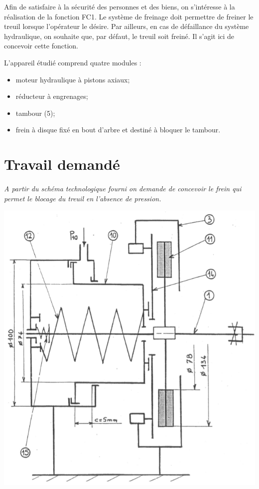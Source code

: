 \documentclass[11pt,oneside]{article}
\begin{document}
Afin de satisfaire à la sécurité des personnes et des biens, on s'intéresse à la réalisation de la fonction FC1. Le système de freinage doit permettre de freiner le treuil lorsque l'opérateur le désire. Par ailleurs, en cas de défaillance du système hydraulique, on souhaite que, par défaut, le treuil soit freiné. Il s'agit ici de concevoir cette fonction.


L'appareil étudié comprend quatre modules : 
\begin{itemize}
\item moteur hydraulique à pistons axiaux;
\item réducteur à engrenages;
\item tambour (5);
\item frein à disque fixé en bout d'arbre et destiné à bloquer le tambour.
\end{itemize}


\section*{Travail demandé}



\paragraph*{}
\textit{A partir du schéma technologique fourni on demande de concevoir le frein qui permet le blocage du treuil en l'absence de pression.}

\begin{center}
\includegraphics[width=.65\textwidth]{png/schema_techno}
\end{center}
\end{document}
